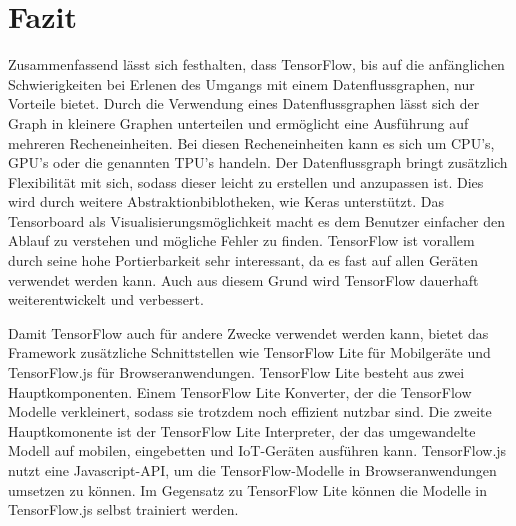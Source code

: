 \chapter{Fazit}
\label{chap:fazit}
\chapterauthor{\authorNiklas}
Zusammenfassend lässt sich festhalten, dass TensorFlow, bis auf die anfänglichen Schwierigkeiten bei Erlenen des Umgangs mit einem Datenflussgraphen, nur Vorteile bietet. Durch die Verwendung eines Datenflussgraphen lässt sich der Graph in kleinere Graphen unterteilen und ermöglicht eine Ausführung auf mehreren Recheneinheiten. Bei diesen Recheneinheiten kann es sich um CPU's, GPU's oder die genannten TPU's handeln. Der Datenflussgraph bringt zusätzlich Flexibilität mit sich, sodass dieser leicht zu erstellen und anzupassen ist. Dies wird durch weitere Abstraktionbiblotheken, wie Keras unterstützt. Das Tensorboard als Visualisierungsmöglichkeit macht es dem Benutzer einfacher den Ablauf zu verstehen und mögliche Fehler zu finden. TensorFlow ist vorallem durch seine hohe Portierbarkeit sehr interessant, da es fast auf allen Geräten verwendet werden kann. Auch aus diesem Grund wird TensorFlow dauerhaft weiterentwickelt und verbessert. 

Damit TensorFlow auch für andere Zwecke verwendet werden kann, bietet das Framework zusätzliche Schnittstellen wie TensorFlow Lite für Mobilgeräte und TensorFlow.js für Browseranwendungen. TensorFlow Lite besteht aus zwei Hauptkomponenten. Einem TensorFlow Lite Konverter, der die TensorFlow Modelle verkleinert, sodass sie trotzdem noch effizient nutzbar sind. Die zweite Hauptkomonente ist der TensorFlow Lite Interpreter, der das umgewandelte Modell auf mobilen, eingebetten und IoT-Geräten ausführen kann.\citep{TensorFlowLite} 
TensorFlow.js nutzt eine Javascript-API, um die TensorFlow-Modelle in Browseranwendungen umsetzen zu können. Im Gegensatz zu TensorFlow Lite können die Modelle in TensorFlow.js selbst trainiert werden.\citep{DeepLearning}